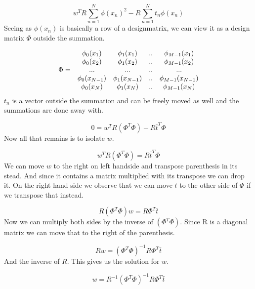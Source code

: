 \documentclass{article}
\begin{document}
\begin{equation*}
    w^T R \sum_{n=1}^{N} \phi(x_n)^2 - R \sum_{n=1}^{N} t_n \phi(x_n) 
\end{equation*}
Seeing as $\phi(x_n)$ is basically a row of a designmatrix, we can view it
as a design matrix $\Phi$ outside the summation.

\begin{equation*}
    \begin{array}{r c c c c}
        &  \phi_0(x_1) & \phi_1(x_1)   & .. & \phi_{M-1}(x_1) \\
        &  \phi_0(x_2) & \phi_1(x_2)   & .. & \phi_{M-1}(x_2) \\
  \Phi =   &  ...  & ... & .. & ...   \\
           &  \phi_0(x_{N-1}) & \phi_1(x_{N-1})   & .. & \phi_{M-1}(x_{N-1}) \\
        &  \phi_0(x_N) & \phi_1(x_N)   & .. & \phi_{M-1}(x_N) 
    \end{array}
\end{equation*}
$t_n$ is a vector outside the summation and can be freely moved as well
and the summations are done away with. 

\begin{equation*}
  0 = w^T R (\Phi^T \Phi) - R \bar{t}^T \Phi 
\end{equation*}
Now all that remains is to isolate $w$.

\begin{equation*}
  w^T R (\Phi^T \Phi) = R \bar{t}^T \Phi 
\end{equation*}
We can move $w$ to the right on left handside and transpose parenthesis in
its stead. And since it contains a matrix multiplied with its transpose we
can drop it. On the right hand side we observe that we can move $t$ to the
other side of $\Phi$ if we transpose that instead. 

\begin{equation*}
  R (\Phi^T \Phi) w = R  \Phi ^T \bar{t}
\end{equation*}
Now we can multiply both sides by the inverse of $(\Phi^T \Phi)$. Since R
is a diagonal matrix we can move that to the right of the parenthesis.

\begin{equation*}
  R w = (\Phi^T \Phi)^{-1} R \Phi ^T  \bar{t}
\end{equation*}
And the inverse of $R$. This gives us the solution for $w$.

\begin{equation*}
  w = R^{-1}(\Phi^T \Phi)^{-1} R \Phi ^T  \bar{t}
\end{equation*}
\end{document}
